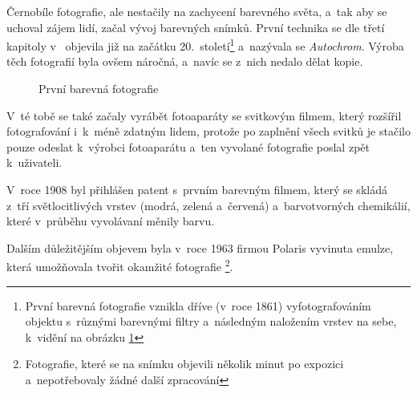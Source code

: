 Černobíle fotografie, ale nestačily na zachycení barevného světa, a~tak aby se uchoval zájem lidí, začal vývoj barevných snímků. První technika se dle třetí kapitoly v~\cite{obrazky_historie} objevila již na začátku 20.~století\footnote{První barevná fotografie vznikla dříve (v~roce 1861) vyfotografováním objektu s~různými barevnými filtry a~následným naložením vrstev na sebe, k~vidění na obrázku \ref{prvni_barev_foto}} a~nazývala se \textit{Autochrom}.
Výroba těch fotografií byla ovšem náročná, a~navíc se z~nich nedalo dělat kopie.

\begin{figure}[ht]
\begin{center}
\caption{První barevná fotografie \cite{obrazek_barev_prvni}}
\label{prvni_barev_foto}
\end{center}
\end{figure}

V~té tobě se také začaly vyrábět fotoaparáty se svitkovým filmem, který rozšířil fotografování i~k~méně zdatným lidem, protože po zaplnění všech svitků je stačilo pouze odeslat k~výrobci fotoaparátu a~ten vyvolané fotografie poslal zpět k~uživateli.

V~roce 1908 byl přihlášen patent s~prvním barevným filmem, který se skládá z~tří světlocitlivých vrstev (modrá, zelená a~červená) a~barvotvorných chemikálií, které v~průběhu vyvolávaní měnily barvu.

Dalším důležitějším objevem byla v~roce 1963 firmou Polaris vyvinuta emulze, která umožňovala tvořit okamžité fotografie \footnote{Fotografie, které se na snímku objevili několik minut po expozici a~nepotřebovaly žádné další zpracování}.

